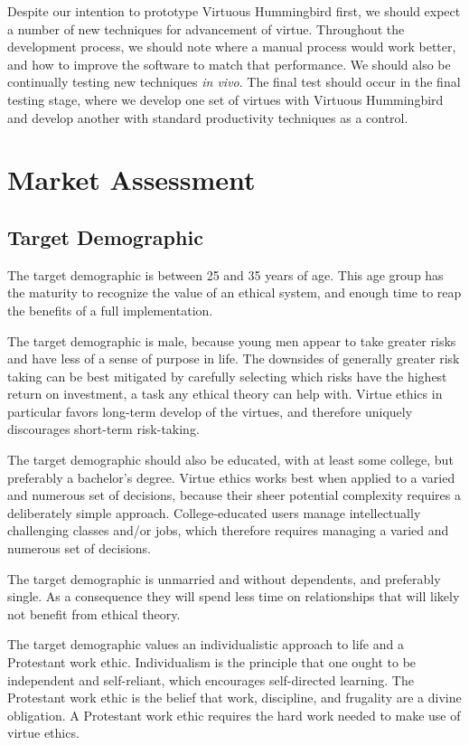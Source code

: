 \documentclass{article}
\begin{document}
Despite our intention to prototype Virtuous Hummingbird first, we should expect a number of new techniques for advancement of virtue.
Throughout the development process, we should note where a manual process would work better, and how to improve the software to match that performance.
We should also be continually testing new techniques \textit{in vivo}.
The final test should occur in the final testing stage, where we develop one set of virtues with Virtuous Hummingbird and develop another with standard productivity techniques as a control.

\section{Market Assessment}

\subsection{Target Demographic}

The target demographic is between 25 and 35 years of age.
This age group has the maturity to recognize the value of an ethical system, and enough time to reap the benefits of a full implementation.

The target demographic is male, because young men appear to take greater risks and have less of a sense of purpose in life.
The downsides of generally greater risk taking can be best mitigated by carefully selecting which risks have the highest return on investment, a task any ethical theory can help with.
Virtue ethics in particular favors long-term develop of the virtues, and therefore uniquely discourages short-term risk-taking.

The target demographic should also be educated, with at least some college, but preferably a bachelor's degree.
Virtue ethics works best when applied to a varied and numerous set of decisions, because their sheer potential complexity requires a deliberately simple approach.
College-educated users manage intellectually challenging classes and/or jobs, which therefore requires managing a varied and numerous set of decisions.

The target demographic is unmarried and without dependents, and preferably single.
As a consequence they will spend less time on relationships that will likely not benefit from ethical theory.

The target demographic values an individualistic approach to life and a Protestant work ethic.
Individualism is the principle that one ought to be independent and self-reliant, which encourages self-directed learning.
The Protestant work ethic is the belief that work, discipline, and frugality are a divine obligation.
A Protestant work ethic requires the hard work needed to make use of virtue ethics.
\end{document}
